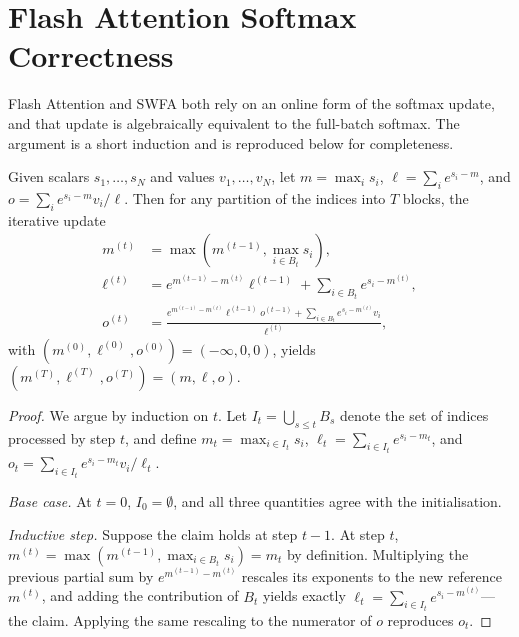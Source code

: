 \section{Flash Attention Softmax
Correctness}\label{app:proof_flash_softmax}

Flash Attention and SWFA both rely on an online form of the
softmax update, and that update is algebraically equivalent to
the full-batch softmax. The argument is a short induction and is
reproduced below for completeness.

\begin{lemma}\label{lem:online_softmax}
Given scalars $s_1, \dots, s_N$ and values $v_1, \dots, v_N$, let
$m = \max_i s_i$,
$\ell = \sum_i e^{s_i - m}$, and $o = \sum_i e^{s_i - m} v_i / \ell$.
Then for any partition of the indices into $T$ blocks,
the iterative update
\begin{align}
    m^{(t)} &= \max(m^{(t-1)}, \max_{i \in B_t} s_i),\\
    \ell^{(t)} &= e^{m^{(t-1)} - m^{(t)}} \ell^{(t-1)}
                 + \sum_{i \in B_t} e^{s_i - m^{(t)}},\\
    o^{(t)} &= \frac{e^{m^{(t-1)} - m^{(t)}} \ell^{(t-1)} o^{(t-1)}
                      + \sum_{i \in B_t} e^{s_i - m^{(t)}} v_i}
                    {\ell^{(t)}},
\end{align}
with $(m^{(0)}, \ell^{(0)}, o^{(0)}) = (-\infty, 0, 0)$, yields
$(m^{(T)}, \ell^{(T)}, o^{(T)}) = (m, \ell, o)$.
\end{lemma}

\begin{proof}
We argue by induction on $t$. Let $I_t = \bigcup_{s \le t} B_s$
denote the set of indices processed by step $t$, and define
$m_t = \max_{i \in I_t} s_i$,
$\ell_t = \sum_{i \in I_t} e^{s_i - m_t}$, and
$o_t = \sum_{i \in I_t} e^{s_i - m_t} v_i / \ell_t$.

\emph{Base case.} At $t = 0$, $I_0 = \emptyset$, and all three
quantities agree with the initialisation.

\emph{Inductive step.} Suppose the claim holds at step $t-1$. At
step $t$, $m^{(t)} = \max(m^{(t-1)}, \max_{i \in B_t} s_i) = m_t$
by definition. Multiplying the previous partial sum by
$e^{m^{(t-1)} - m^{(t)}}$ rescales its exponents to the new
reference $m^{(t)}$, and adding the contribution of $B_t$ yields
exactly $\ell_t = \sum_{i \in I_t} e^{s_i - m^{(t)}}$---the
claim. Applying the same rescaling to the numerator of $o$
reproduces $o_t$.
\end{proof}

